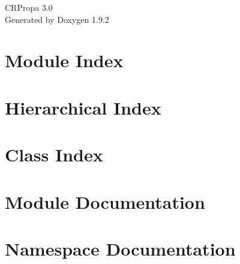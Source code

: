 \documentclass[twoside]{book}
\newcommand{\+}{\discretionary{\mbox{\scriptsize$\hookleftarrow$}}{}{}}
\newcommand{\clearemptydoublepage}{%
    \newpage{\pagestyle{empty}\cleardoublepage}%
  }
\begin{document}
  \raggedbottom
    \hypersetup{pageanchor=false,
                bookmarksnumbered=true,
                pdfencoding=unicode
               }
  \begin{titlepage}
  \vspace*{7cm}
  \begin{center}%
  {\Large CRPropa 3.\+0}\\
  \vspace*{1cm}
  {\large Generated by Doxygen 1.9.2}\\
  \end{center}
  \end{titlepage}
  \clearemptydoublepage
  \tableofcontents
  \clearemptydoublepage
  \hypersetup{pageanchor=true}
\chapter{Module Index}

\chapter{Hierarchical Index}

\chapter{Class Index}

\chapter{Module Documentation}













\chapter{Namespace Documentation}

\end{document}
